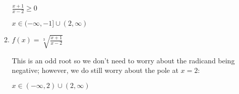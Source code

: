 \documentclass[letterpaper,12pt,fleqn]{article}
\begin{document}
\begin{enumerate}
\begin{enumerate}
    $\frac{x+1}{x-2}\ge0$

    \bigskip


    \bigskip

    $x\in(-\infty,-1]\cup(2,\infty)$

  \item $f(x)=\sqrt[3]{\frac{x+1}{x-2}}$

    This is an odd root so we don't need to worry about the radicand being negative;
    however, we do still worry about the pole at $x=2$:

    $x\in(-\infty,2)\cup(2,\infty)$
  \end{enumerate}
\end{enumerate}
\end{document}
